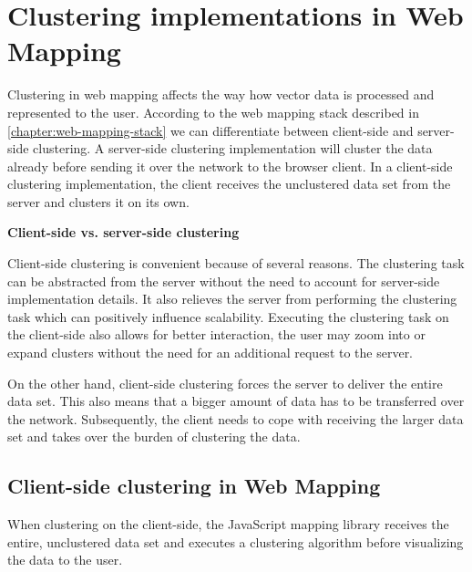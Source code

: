 
%
%

\section{Clustering implementations in Web Mapping}

Clustering in web mapping affects the way how vector data is processed and represented to the user.  According to the web mapping stack described in \ref{chapter:web-mapping-stack} we can differentiate between client-side and server-side clustering. A server-side clustering implementation will cluster the data already before sending it over the network to the browser client. In a client-side clustering implementation, the client receives the unclustered data set from the server and clusters it on its own.

\textbf{Client-side vs. server-side clustering}

Client-side clustering is convenient because of several reasons. The clustering task can be abstracted from the server without the need to account for server-side implementation details. It also relieves the server from performing the clustering task which can positively influence scalability. Executing the clustering task on the client-side also allows for better interaction, the user may zoom into or expand clusters without the need for an additional request to the server. 

On the other hand, client-side clustering forces the server to deliver the entire data set. This also means that a bigger amount of data has to be transferred over the network. Subsequently, the client needs to cope with receiving the larger data set and takes over the burden of clustering the data.

\subsection{Client-side clustering in Web Mapping}

When clustering on the client-side, the JavaScript mapping library receives the entire, unclustered data set and executes a clustering algorithm before visualizing the data to the user.


